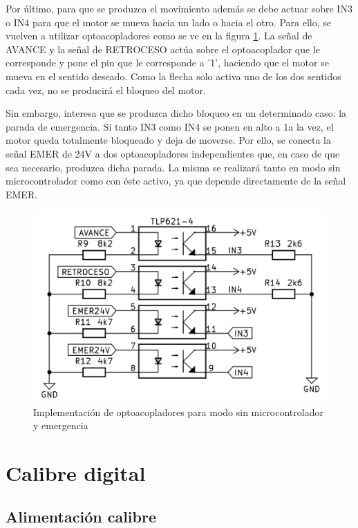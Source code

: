 Por último, para que se produzca el movimiento además se debe actuar sobre IN3 o IN4 para que el motor se
mueva hacia un lado o hacia el otro. Para ello, se vuelven a utilizar optoacopladores como se ve en la
figura \ref{fig:sinmicro}. La señal de AVANCE y la señal de RETROCESO actúa sobre el optoacoplador que
le corresponde y pone el pin que le corresponde a '1', haciendo que el motor se mueva en el sentido deseado.
Como la flecha solo activa uno de los dos sentidos cada vez, no se producirá el bloqueo del motor.

Sin embargo, interesa que se produzca dicho bloqueo en un determinado caso: la parada de emergencia. Si tanto
IN3 como IN4 se ponen en alto a 1a la vez, el motor queda totalmente bloqueado y deja de moverse. Por ello, 
se conecta la señal EMER de 24V a dos optoacopladores independientes que, en caso de que sea necesario,
produzca dicha parada. La misma se realizará tanto en modo sin microcontrolador como con éste activo, ya que 
depende directamente de la señal EMER.

\begin{figure}[hbtp]
    \centering
    \includegraphics[scale=1.25]{03-placa/sinmicro.jpg}
    \caption{Implementación de optoacopladores para modo sin microcontrolador y emergencia}
    \label{fig:sinmicro}
    \end{figure}

\section{Calibre digital}

\subsection{Alimentación calibre}

